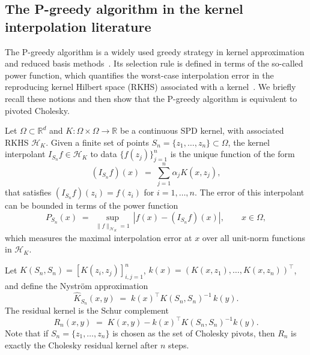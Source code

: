 \documentclass{amsart}
\theoremstyle{definition}
\theoremstyle{remark}
\begin{document}
\subsection{The P-greedy algorithm in the kernel interpolation literature}\label{sec:Pgreedy}

The P-greedy algorithm is a widely used greedy strategy in kernel approximation and reduced basis methods~\cite{wenzel2023analysis}. Its selection rule is defined in terms of the so-called power function, which quantifies the worst-case interpolation error in the reproducing kernel Hilbert space (RKHS) associated with a kernel~\cite{de2005near,schaback2000adaptive}. 
We briefly recall these notions and then show that the P-greedy algorithm is equivalent to pivoted Cholesky.

Let $\Omega\subset \mathbb{R}^d$ and $K:\Omega\times\Omega\to\mathbb{R}$ be a continuous SPD kernel, with associated RKHS $\mathcal{H}_K$. 
Given a finite set of points $S_n=\{z_1,\dots,z_n\}\subset\Omega$, the kernel interpolant $I_{S_n} f\in \mathcal{H}_K$ to data $\{f(z_j)\}_{j=1}^n$ is the unique function of the form
\[
(I_{S_n} f)(x) \;=\; \sum_{j=1}^n \alpha_j K(x,z_j),
\]
that satisfies $(I_{S_n} f)(z_i)=f(z_i)$ for $i=1,\dots,n$.  
The error of this interpolant can be bounded in terms of the power function
\[
    P_{S_n}(x) \;=\; \sup_{\|f\|_{\mathcal{H}_K}=1}\, |f(x) - (I_{S_n} f)(x)|, \qquad x\in\Omega,
\]
which measures the maximal interpolation error at $x$ over all unit-norm functions in $\mathcal{H}_K$.

Let $K(S_n,S_n)=[K(z_i,z_j)]_{i,j=1}^n$, $k(x) = (K(x,z_1),\dots,K(x,z_n))^\top$, and define the Nystr\"{o}m approximation
\[
    \widehat K_{S_n}(x,y) \;=\; k(x)^\top K(S_n,S_n)^{-1}\, k(y).
\]
The residual kernel is the Schur complement
\begin{equation}\label{eq:residual-kernel}
    R_n(x,y) \;=\; K(x,y) - k(x)^\top K(S_n,S_n)^{-1} k(y).
\end{equation}
Note that if $S_n=\{z_1,\dots,z_n\}$ is chosen as the set of Cholesky pivots, then $R_n$ is exactly the Cholesky residual kernel after $n$ steps.
\end{document}
